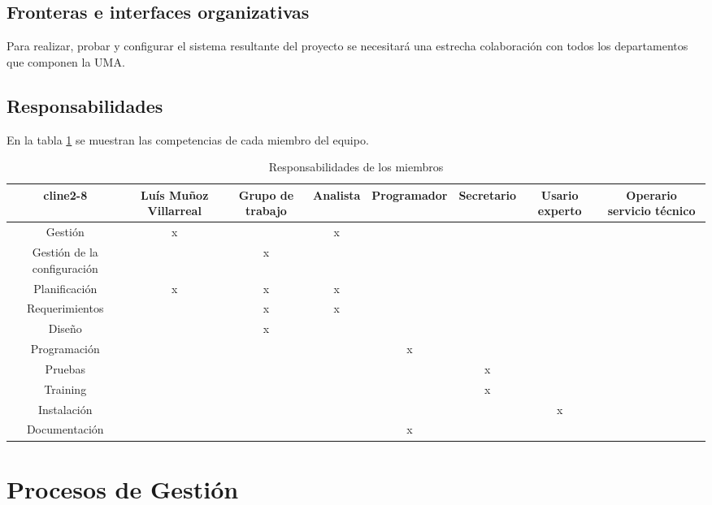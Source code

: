 \documentclass[11pt,a4paper,spanish,twoside]{report}
\begin{document}
\section{Fronteras e interfaces organizativas}
Para realizar, probar y configurar el sistema resultante del proyecto se 
necesitará una estrecha colaboración con todos los departamentos que componen 
la UMA. 
\section{Responsabilidades}
En la tabla \ref{Tab:Respon} se muestran las competencias de cada miembro del
  equipo.
\begin{table}[!h]
\centering
  \begin{tabular}{c|c|c|c|c|c|c|c}
  cline{2-8}&\textbf{Luís Muñoz Villarreal} & \textbf{Grupo de trabajo} &
  \textbf{Analista} & \textbf{Programador} & \textbf{Secretario} &
  \textbf{Usario experto} & \textbf{Operario servicio técnico}\\
    \hline \hline
    Gestión & x &  & x &  &  &  &\\ 
    \hline
    Gestión de la configuración &  & x &  &  &  &  &\\
    \hline
    Planificación & x & x & x &  &  &  &  &\\
    \hline
    Requerimientos &  & x & x &  &  &  &  &\\
    \hline
    Diseño &  & x &  &  &  &  &\\
    \hline
    Programación &  &  &  & x &  &  &\\
    \hline
    Pruebas & &  &  &  & x &  &\\
    \hline
    Training &  &  &  &  & x &  &\\
    \hline
    Instalación &  &  &  &  &  & x &\\
    \hline
    Documentación &  &  &  & x &  &  &\\
  \end{tabular}
  \caption{Responsabilidades de los miembros} \label{Tab:Respon}
\end{table}
\chapter{Procesos de Gestión}
\end{document}
